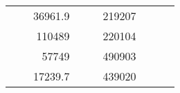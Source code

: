 \begin{table}[]
\begin{tabular}{|ccrccrccc}
\multicolumn{1}{|c|}{\cellcolor[HTML]{FFFFC7}}                                & \multicolumn{1}{c|}{\cellcolor[HTML]{DAE8FC}}                      & \multicolumn{1}{r|}{\cellcolor[HTML]{DAE8FC}36961.9}   & \multicolumn{1}{c|}{\cellcolor[HTML]{FFFFC7}}                                & \multicolumn{1}{c|}{\cellcolor[HTML]{DAE8FC}}                       & \multicolumn{1}{r|}{\cellcolor[HTML]{DDFDFF}219207}    &                                                                              &                                                                    &                                                        \\ \cline{3-3} \cline{6-6}
\multicolumn{1}{|c|}{\cellcolor[HTML]{FFFFC7}}                                & \multicolumn{1}{c|}{\cellcolor[HTML]{DAE8FC}}                      & \multicolumn{1}{r|}{\cellcolor[HTML]{DDFDFF}110489}    & \multicolumn{1}{c|}{\cellcolor[HTML]{FFFFC7}}                                & \multicolumn{1}{c|}{\cellcolor[HTML]{DAE8FC}}                       & \multicolumn{1}{r|}{\cellcolor[HTML]{DAE8FC}220104}    &                                                                              &                                                                    &                                                        \\ \cline{3-3} \cline{6-6}
\multicolumn{1}{|c|}{\cellcolor[HTML]{FFFFC7}}                                & \multicolumn{1}{c|}{\cellcolor[HTML]{DAE8FC}}                      & \multicolumn{1}{r|}{\cellcolor[HTML]{DAE8FC}57749}     & \multicolumn{1}{c|}{\cellcolor[HTML]{FFFFC7}}                                & \multicolumn{1}{c|}{\cellcolor[HTML]{DAE8FC}}                       & \multicolumn{1}{r|}{\cellcolor[HTML]{DDFDFF}490903}    &                                                                              &                                                                    &                                                        \\ \cline{3-3} \cline{6-6}
\multicolumn{1}{|c|}{\cellcolor[HTML]{FFFFC7}}                                & \multicolumn{1}{c|}{\cellcolor[HTML]{DAE8FC}}                      & \multicolumn{1}{r|}{\cellcolor[HTML]{DDFDFF}17239.7}   & \multicolumn{1}{c|}{\cellcolor[HTML]{FFFFC7}}                                & \multicolumn{1}{c|}{\cellcolor[HTML]{DAE8FC}}                       & \multicolumn{1}{r|}{\cellcolor[HTML]{DAE8FC}439020}    &                                                                              &                                                                    &                                                        \\ \cline{3-3} \cline{6-6}

\end{tabular}
\end{table}
